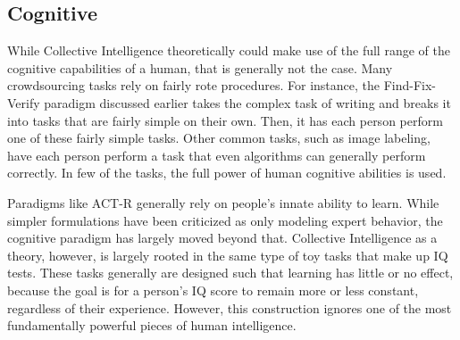 \subsection{Cognitive}

While Collective Intelligence theoretically could make use of the full range of the cognitive capabilities of a human, that is generally not the case. Many crowdsourcing tasks rely on fairly rote procedures. For instance, the Find-Fix-Verify paradigm discussed earlier takes the complex task of writing and breaks it into tasks that are fairly simple on their own. Then, it has each person perform one of these fairly simple tasks. Other common tasks, such as image labeling, have each person perform a task that even algorithms can generally perform correctly. In few of the tasks, the full power of human cognitive abilities is used.

Paradigms like ACT-R \cite{actr} generally rely on people's innate ability to learn. While simpler formulations have been criticized as only modeling expert behavior, the cognitive paradigm has largely moved beyond that. Collective Intelligence as a theory, however, is largely rooted in the same type of toy tasks that make up IQ tests. These tasks generally are designed such that learning has little or no effect, because the goal is for a person's IQ score to remain more or less constant, regardless of their experience. However, this construction ignores one of the most fundamentally powerful pieces of human intelligence. 